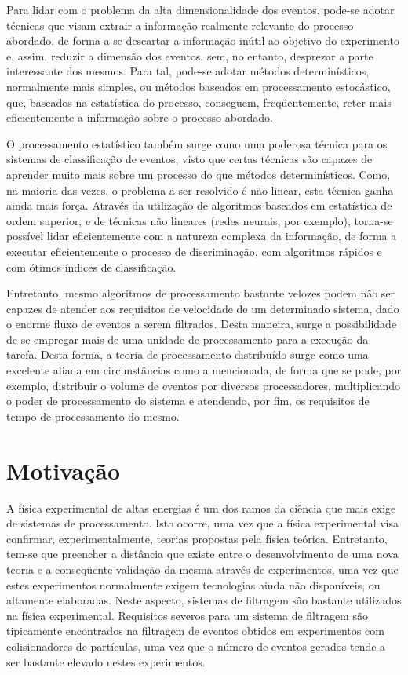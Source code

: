Para lidar com o problema da alta dimensionalidade dos eventos, pode-se adotar técnicas que visam extrair a informação realmente relevante do processo abordado, de forma a se descartar a informação inútil ao objetivo do experimento e, assim, reduzir a dimensão dos eventos, sem, no entanto, desprezar a parte interessante dos mesmos. Para tal, pode-se adotar métodos determinísticos, normalmente mais simples, ou métodos baseados em processamento estocástico, que, baseados na estatística do processo, conseguem, freqüentemente, reter mais eficientemente a informação sobre o processo abordado.

O processamento estatístico também surge como uma poderosa técnica para os sistemas de classificação de eventos, visto que certas técnicas são capazes de aprender muito mais sobre um processo do que métodos determinísticos. Como, na maioria das vezes, o problema a ser resolvido é não linear, esta técnica ganha ainda mais força. Através da utilização de algoritmos baseados em estatística de ordem superior, e de técnicas não lineares (redes neurais, por exemplo), torna-se possível lidar eficientemente com a natureza complexa da informação, de forma a executar eficientemente o processo de discriminação, com algoritmos rápidos e com ótimos índices de classificação.


Entretanto, mesmo algoritmos de processamento bastante velozes podem não ser capazes de atender aos requisitos de velocidade de um determinado sistema, dado o enorme fluxo de eventos a serem filtrados. Desta maneira, surge a possibilidade de se empregar mais de uma unidade de processamento para a execução da tarefa. Desta forma, a teoria de processamento distribuído surge como uma excelente aliada em circunstâncias como a mencionada, de forma que se pode, por exemplo, distribuir o volume de eventos por diversos processadores, multiplicando o poder de processamento do sistema e atendendo, por fim, os requisitos de tempo de processamento do mesmo. 


\section{Motivação}

A física experimental de altas energias é um dos ramos da ciência que mais exige de sistemas de processamento. Isto ocorre, uma vez que a física experimental visa confirmar, experimentalmente, teorias propostas pela física teórica. Entretanto, tem-se que preencher a distância que existe entre o desenvolvimento de uma nova teoria e a conseqüente validação da mesma através de experimentos, uma vez que estes experimentos normalmente exigem tecnologias ainda não disponíveis, ou altamente elaboradas. Neste aspecto, sistemas de filtragem são bastante utilizados na física experimental. Requisitos severos para um sistema de filtragem são tipicamente encontrados na filtragem de eventos obtidos em experimentos com colisionadores de partículas, uma vez que o número de eventos gerados tende a ser bastante elevado nestes experimentos.

